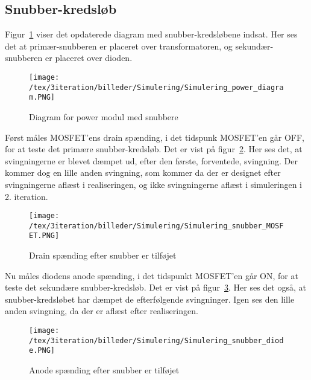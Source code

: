 
\subsection{Snubber-kredsløb}
Figur~\ref{fig:simulering_diagram_snubber_3} viser det opdaterede diagram med snubber-kredsløbene indsat. Her ses det at primær-snubberen er placeret over transformatoren, og sekundær-snubberen er placeret over dioden. 

\begin{figure}[H]
	\center
	\texttt{[image: /tex/3iteration/billeder/Simulering/Simulering\_power\_diagram.PNG]}
	\caption{Diagram for power modul med snubbere}
	\label{fig:simulering_diagram_snubber_3}
\end{figure}

Først måles MOSFET'ens drain spænding, i det tidspunk MOSFET'en går OFF, for at teste det primære snubber-kredsløb. Det er vist på figur~\ref{fig:simulering_snubber_MOSFET_3}. Her ses det, at svingningerne er blevet dæmpet ud, efter den første, forventede, svingning. Der kommer dog en lille anden svingning, som kommer da der er designet efter svingningerne aflæst i realiseringen, og ikke svingningerne aflæst i simuleringen i 2. iteration. 

\begin{figure}[H]
	\center
	\texttt{[image: /tex/3iteration/billeder/Simulering/Simulering\_snubber\_MOSFET.PNG]}
	\caption{Drain spænding efter snubber er tilføjet}
	\label{fig:simulering_snubber_MOSFET_3}
\end{figure}

Nu måles diodens anode spænding, i det tidspunkt MOSFET'en går ON, for at teste det sekundære snubber-kredsløb. Det er vist på figur~\ref{fig:simulering_snubber_diode_3}. Her ses det også, at snubber-kredsløbet har dæmpet de efterfølgende svingninger. Igen ses den lille anden svingning, da der er aflæst efter realiseringen.

\begin{figure}[H]
	\center
	\texttt{[image: /tex/3iteration/billeder/Simulering/Simulering\_snubber\_diode.PNG]}
	\caption{Anode spænding efter snubber er tilføjet}
	\label{fig:simulering_snubber_diode_3}
\end{figure}






